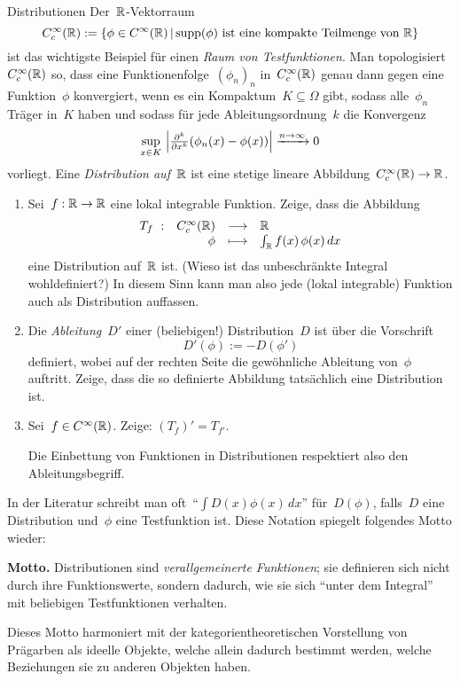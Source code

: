 \documentclass{pizzablatt}
\begin{document}

\begin{aufgabe}{Distributionen}
Der~$\mathbb{R}$-Vektorraum
\[ C^\infty_c(\mathbb{R}) := \{ \phi \in C^\infty(\mathbb{R}) \,|\,
  \text{$\operatorname{supp}(\phi)$ ist eine kompakte Teilmenge von~$\mathbb{R}$}
  \} \]
ist das wichtigste Beispiel für einen \emph{Raum von Testfunktionen}. Man
topologisiert~$C^\infty_c(\mathbb{R})$ so, dass eine Funktionenfolge~$(\phi_n)_n$
in~$C^\infty_c(\mathbb{R})$ genau dann gegen eine Funktion~$\phi$ konvergiert, wenn
es ein Kompaktum~$K \subseteq \Omega$ gibt, sodass alle~$\phi_n$ Träger in~$K$
haben und sodass für jede Ableitungsordnung~$k$ die Konvergenz
\[ \sup_{x \in K}\ \Bigl|\tfrac{\partial^k}{\partial x^k} (\phi_n(x) -
\phi(x))\Bigr| \xrightarrow{n \to \infty} 0 \]
vorliegt. Eine \emph{Distribution auf~$\mathbb{R}$} ist eine stetige lineare
Abbildung~$C^\infty_c(\mathbb{R}) \to \mathbb{R}$.

\begin{enumerate}
\item Sei~$f : \mathbb{R} \to \mathbb{R}$ eine lokal integrable Funktion. Zeige, dass die Abbildung
\[ \begin{array}{@{}rrcl@{}}
  T_f\ : & C^\infty_c(\RR) &\longrightarrow& \RR \\
  & \phi &\longmapsto& \int_\RR f(x) \, \phi(x) \,dx
\end{array} \]
eine Distribution auf~$\mathbb{R}$ ist. (Wieso ist das unbeschränkte Integral
wohldefiniert?) In diesem Sinn kann man also jede (lokal integrable) Funktion
auch als Distribution auffassen.
\item Die \emph{Ableitung~$D'$} einer (beliebigen!) Distribution~$D$ ist über die Vorschrift
\[ D'(\phi) := -D(\phi') \]
definiert, wobei auf der rechten Seite die gewöhnliche Ableitung von~$\phi$
auftritt. Zeige, dass die so definierte Abbildung tatsächlich eine Distribution
ist.
\item Sei~$f \in C^\infty(\mathbb{R})$. Zeige: $(T_f)' = T_{f'}$.

Die Einbettung von Funktionen in Distributionen respektiert also den
Ableitungsbegriff.
\end{enumerate}

In der Literatur schreibt man oft~"`$\int D(x) \phi(x)
\,dx$"' für~$D(\phi)$, falls~$D$ eine Distribution und~$\phi$ eine Testfunktion
ist. Diese Notation spiegelt folgendes Motto wieder:

\textbf{Motto.} Distributionen sind \emph{verallgemeinerte Funktionen}; sie
definieren sich nicht durch ihre Funktionswerte, sondern dadurch, wie sie sich
"`unter dem Integral"' mit beliebigen Testfunktionen verhalten.

Dieses Motto harmoniert mit der kategorientheoretischen Vorstellung von
Prägarben als ideelle Objekte, welche allein dadurch bestimmt werden, welche Beziehungen sie zu
anderen Objekten haben.
\end{aufgabe}
\end{document}

